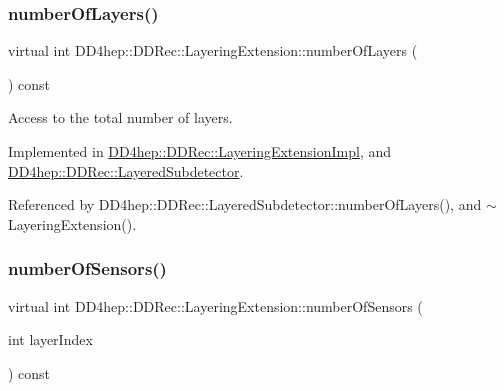 \hypertarget{class_d_d4hep_1_1_d_d_rec_1_1_layering_extension_a2a0ee0e2bdb875de6573591e2648e446}{}\label{class_d_d4hep_1_1_d_d_rec_1_1_layering_extension_a2a0ee0e2bdb875de6573591e2648e446} 
\subsubsection{\texorpdfstring{number\+Of\+Layers()}{numberOfLayers()}}
{\footnotesize\ttfamily virtual int D\+D4hep\+::\+D\+D\+Rec\+::\+Layering\+Extension\+::number\+Of\+Layers (\begin{DoxyParamCaption}{ }\end{DoxyParamCaption}) const\hspace{0.3cm}{\ttfamily [pure virtual]}}



Access to the total number of layers. 



Implemented in \hyperlink{class_d_d4hep_1_1_d_d_rec_1_1_layering_extension_impl_aa0489a7a78bd134ff3ecdf2509c3c1c0}{D\+D4hep\+::\+D\+D\+Rec\+::\+Layering\+Extension\+Impl}, and \hyperlink{class_d_d4hep_1_1_d_d_rec_1_1_layered_subdetector_add44040c1b0a5578a1fe65d3921a4195}{D\+D4hep\+::\+D\+D\+Rec\+::\+Layered\+Subdetector}.



Referenced by D\+D4hep\+::\+D\+D\+Rec\+::\+Layered\+Subdetector\+::number\+Of\+Layers(), and $\sim$\+Layering\+Extension().

\hypertarget{class_d_d4hep_1_1_d_d_rec_1_1_layering_extension_a91d00c26112a0456117d1036db335e5d}{}\label{class_d_d4hep_1_1_d_d_rec_1_1_layering_extension_a91d00c26112a0456117d1036db335e5d} 
\subsubsection{\texorpdfstring{number\+Of\+Sensors()}{numberOfSensors()}}
{\footnotesize\ttfamily virtual int D\+D4hep\+::\+D\+D\+Rec\+::\+Layering\+Extension\+::number\+Of\+Sensors (\begin{DoxyParamCaption}\item[{int}]{layer\+Index }\end{DoxyParamCaption}) const\hspace{0.3cm}{\ttfamily [pure virtual]}}



